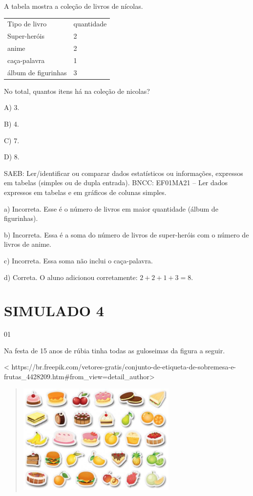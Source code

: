 \begin{itemize}
\begin{itemize}
A tabela mostra a coleção de livros de nícolas.

\begin{longtable}[]{@{}ll@{}}
\toprule
Tipo de livro & quantidade\tabularnewline
Super-heróis & 2\tabularnewline
anime & 2\tabularnewline
caça-palavra & 1\tabularnewline
álbum de figurinhas & 3\tabularnewline
\bottomrule
\end{longtable}

No total, quantos itens há na coleção de nicolas?

A) 3.

B) 4.

C) 7.

D) 8.

SAEB: Ler/identificar ou comparar dados estatísticos ou
informações, expressos em tabelas (simples ou de dupla entrada).
BNCC: EF01MA21 -- Ler dados expressos em tabelas e em gráficos de colunas
simples.

a) Incorreta. Esse é o número de livros em maior quantidade (álbum de figurinhas).

b) Incorreta. Essa é a soma do número de livros de super-heróis com o número de livros de anime.

c) Incorreta. Essa soma não inclui o caça-palavra.

d) Correta. O aluno adicionou corretamente: \(2 + 2 + 1 + 3 = 8\).

\chapter{SIMULADO 4}

\num{01}

Na festa de 15 anos de rúbia tinha todas as guloseimas da figura a
seguir.

\textless{}
https://br.freepik.com/vetores-gratis/conjunto-de-etiqueta-de-sobremesa-e-frutas\_4428209.htm\#from\_view=detail\_author\textgreater{}

\begin{quote}
\includegraphics[width=3.09935in,height=2.16853in]{media/image151.jpg}


\end{quote}
\end{itemize}
\end{itemize}
